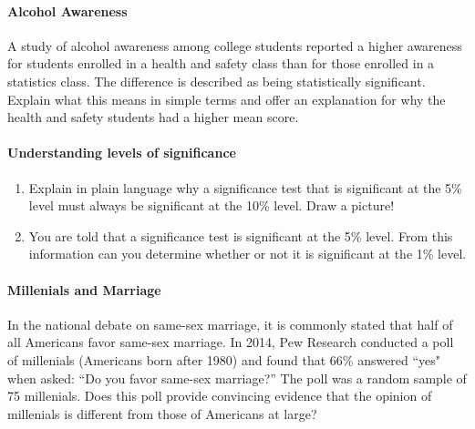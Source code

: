 \documentclass[10pt]{article}\usepackage[]{graphicx}\usepackage[]{color}
\begin{document}
\clearpage
\paragraph{Alcohol Awareness}
A study of alcohol awareness among college students reported a higher awareness for students enrolled in a health and safety class than for those enrolled in a statistics class. The difference is described as being statistically significant. Explain what this means in simple terms and offer an explanation for why the health and safety students had a higher mean score. 

\vspace{1in}

\paragraph{Understanding levels of significance}
\begin{enumerate}
  \itemsep0.5in
  \item Explain in plain language why a significance test that is significant at the 5\% level must always be significant at the 10\% level. Draw a picture!
  \item You are told that a significance test is significant at the 5\% level. From this information can you determine whether or not it is significant at the 1\% level. 
\end{enumerate}

\vspace{0.75in}


\paragraph{Millenials and Marriage}
In the national debate on same-sex marriage, it is commonly stated that half of all Americans favor same-sex marriage.  In 2014, Pew Research conducted a poll of millenials (Americans born after 1980) and found that 66\% answered ``yes" when asked: ``Do you favor same-sex marriage?''  The poll was a random sample of 75 millenials.  Does this poll provide convincing evidence that the opinion of millenials is different from those of Americans at large?
\end{document}
